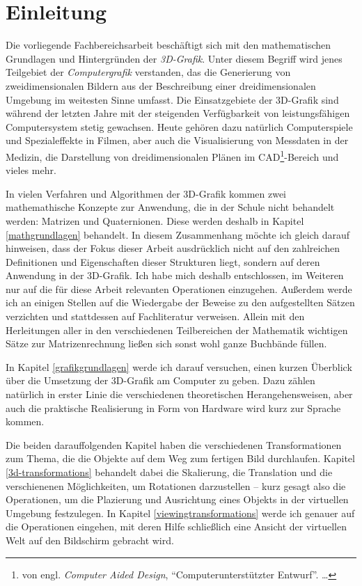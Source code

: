 \chapter{Einleitung}

Die vorliegende Fachbereichsarbeit beschäftigt sich mit den mathematischen Grundlagen und Hintergründen der \emph{3D-Grafik}. Unter diesem Begriff wird jenes Teilgebiet der \emph{Computergrafik} verstanden, das die Generierung von zweidimensionalen Bildern aus der Beschreibung einer dreidimensionalen Umgebung im weitesten Sinne umfasst. Die Einsatzgebiete der 3D-Grafik sind während der letzten Jahre mit der steigenden Verfügbarkeit von leistungsfähigen Computersystem stetig gewachsen. Heute gehören dazu natürlich Computerspiele und Spezialeffekte in Filmen, aber auch die Visualisierung von Messdaten in der Medizin, die Darstellung von dreidimensionalen Plänen im CAD\footnote{von engl. \emph{Computer Aided Design}, \enquote{Computerunterstützter Entwurf}. \ldots}-Bereich und vieles mehr.

In vielen Verfahren und Algorithmen der 3D-Grafik kommen zwei mathemathische Konzepte zur Anwendung, die in der Schule nicht behandelt werden: Matrizen und Quaternionen. Diese werden deshalb in Kapitel \ref{mathgrundlagen} behandelt. In diesem Zusammenhang möchte ich gleich darauf hinweisen, dass der Fokus dieser Arbeit ausdrücklich nicht auf den zahlreichen Definitionen und Eigenschaften dieser Strukturen liegt, sondern auf deren Anwendung in der 3D-Grafik.  Ich habe mich deshalb entschlossen, im Weiteren nur auf die für diese Arbeit relevanten Operationen einzugehen. Außerdem werde ich an einigen Stellen auf die Wiedergabe der Beweise zu den aufgestellten Sätzen verzichten und stattdessen auf Fachliteratur verweisen. Allein mit den Herleitungen aller in den verschiedenen Teilbereichen der Mathematik wichtigen Sätze zur Matrizenrechnung ließen sich sonst wohl ganze Buchbände füllen.

In Kapitel \ref{grafikgrundlagen} werde ich darauf versuchen, einen kurzen Überblick über die Umsetzung der 3D-Grafik am Computer zu geben. Dazu zählen natürlich in erster Linie die verschiedenen theoretischen Herangehensweisen, aber auch die praktische Realisierung in Form von Hardware wird kurz zur Sprache kommen.

Die beiden darauffolgenden Kapitel haben die verschiedenen Transformationen zum Thema, die die Objekte auf dem Weg zum fertigen Bild durchlaufen. Kapitel \ref{3d-transformations} behandelt dabei die Skalierung, die Translation und die verschienenen Möglichkeiten, um Rotationen darzustellen -- kurz gesagt also die Operationen, um die Plazierung und Ausrichtung eines Objekts in der virtuellen Umgebung festzulegen. In Kapitel \ref{viewingtransformations} werde ich genauer auf die Operationen eingehen, mit deren Hilfe schließlich eine Ansicht der virtuellen Welt auf den Bildschirm gebracht wird.

